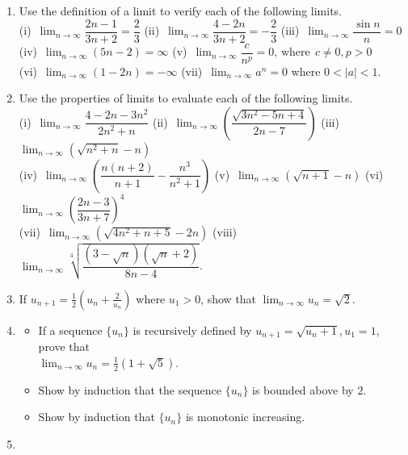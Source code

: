 \documentclass[titlepage,a4paper,12pt]{report}
\begin{document}
\begin{enumerate}
\item Use the definition of a limit to verify each of the following limits.\\
(i)\, $\displaystyle \lim _{n\rightarrow \infty}\dfrac{2n-1}{3n+2}=\dfrac{2}{3}$ \quad  (ii)\, $\displaystyle \lim _{n\rightarrow \infty}\dfrac{4-2n}{3n+2}=-\dfrac{2}{3}$ \quad (iii)\, $\displaystyle \lim _{n\rightarrow \infty}\dfrac{\sin n}{n}=0$ \\
 (iv)\, $\displaystyle \lim _{n\rightarrow \infty}(5n-2)=\infty$ \quad (v)\, $\displaystyle \lim _{n\rightarrow \infty}\dfrac{c}{n^p}=0,\, \mbox{where}~~ c\neq 0, p>0$ \\ (vi)\, $\displaystyle \lim _{n\rightarrow \infty}(1-2n)=-\infty$ \quad (vii)\,  $\displaystyle \lim _{n\rightarrow \infty} a^n=0$ where $0< |a|<1$. 
 \item Use the properties of limits to evaluate each of the following limits.\\
 (i)\, $\displaystyle \lim _{n\rightarrow \infty}\dfrac{4-2n-3n^2}{2n^2+n}$ \quad (ii)\, $\displaystyle \lim _{n\rightarrow \infty}\left( \dfrac{\sqrt{3n^2-5n+4}}{2n-7}\right )$ \quad (iii)\, $\displaystyle \lim _{n\rightarrow \infty}(\sqrt{n^2+n}-n )$\\ (iv)\, $\displaystyle \lim _{n\rightarrow \infty}\left(\dfrac{n(n+2)}{n+1}-\dfrac{n^3}{n^2+1} \right)$ \quad (v)\, $\displaystyle \lim _{n\rightarrow \infty}(\sqrt{n+1}-n)$ \quad (vi)\, $\displaystyle \lim _{n\rightarrow \infty}\left(\dfrac{2n-3}{3n+7}\right)^4$ \\ (vii)\, $\displaystyle \lim _{n\rightarrow \infty}(\sqrt{4n^2+n+5}-2n)$ \quad (viii)\, $\displaystyle \lim _{n\rightarrow \infty}\sqrt[3]{\dfrac{(3-\sqrt{n})(\sqrt{n}+2)}{8n-4}}$.
 \item If $u_{n+1}=\frac{1}{2}(u_n+\frac{2}{u_n})$ where $u_1>0$, show that $\displaystyle \lim _{n\rightarrow \infty}u_n=\sqrt{2}$.
 \item \begin{itemize}
 \item[(i)] If a sequence $\{u_n\}$ is recursively defined by $u_{n+1}=\sqrt{u_n+1}, u_1=1$, prove that\\ $\displaystyle \lim _{n\rightarrow \infty}u_n=\frac{1}{2}(1+\sqrt{5})$.
 \item[(ii)] Show by induction that the sequence $\{u_n\}$ is bounded above by $2$.
 \item[(iii)] Show by induction that $\{u_n\}$ is monotonic increasing.
 \end{itemize}
 \item 

\end{enumerate}
\end{document}
